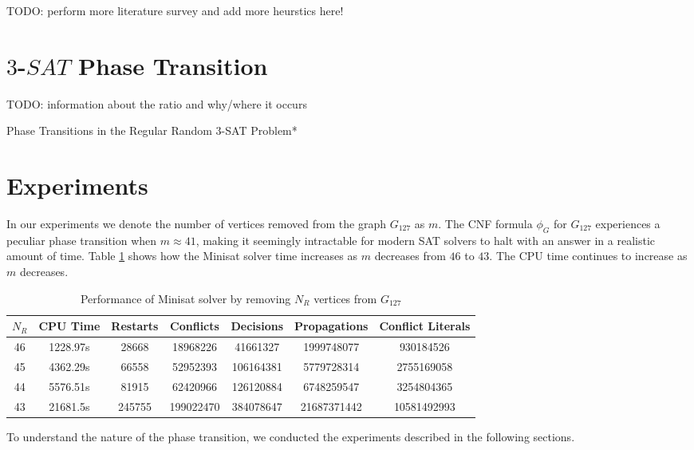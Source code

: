 \documentclass[paper=a4, fontsize=11pt]{scrartcl} %
\newcommand{\TODO}{{\color{red}TODO}}
\begin{document}
\TODO: perform more literature survey and add more heurstics here!


\section{$3$-$SAT$ Phase Transition}
\TODO: information about the ratio and why/where it occurs

Phase Transitions in the Regular Random 3-SAT Problem*

\section{Experiments}
In our experiments we denote the number of vertices removed from the graph $G_{127}$ as $m$.
The CNF formula $\phi_G$ for $G_{127}$ experiences a peculiar phase transition when $m \approx 41$,
making it seemingly intractable for modern SAT solvers to halt with an answer in a realistic 
amount of time. Table \ref{tab:performanceSat} shows how the Minisat solver time increases 
as $m$ decreases from $46$ to $43$. The CPU time continues to increase as $m$ decreases.

\begin{table}
	\caption{Performance of Minisat solver by removing $N_R$ vertices from $G_{127}$}
	\begin{tabular}{c | c | c | c | c | c | c}
		\hline
		$N_R$ & CPU Time & Restarts & Conflicts & Decisions & Propagations & Conflict Literals \\ \hline
		46 & 1228.97s & 28668 & 18968226 & 41661327 & 1999748077 & 930184526 \\ 
		45 & 4362.29s & 66558 & 52952393 & 106164381 & 5779728314 & 2755169058 \\ 
		44 & 5576.51s & 81915 & 62420966 & 126120884 & 6748259547 & 3254804365 \\ 
		43 & 21681.5s & 245755 & 199022470 & 384078647 & 21687371442 & 10581492993 \\ 
		\hline
	\end{tabular}
	\label{tab:performanceSat}
\end{table}

To understand the nature of the phase transition, we conducted the experiments
described in the following sections.
\end{document}
